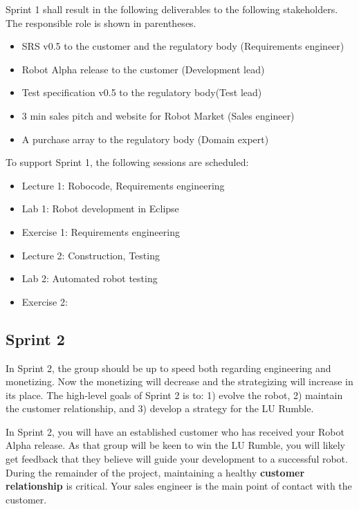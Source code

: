 \documentclass{scrreprt}
\begin{document}
Sprint 1 shall result in the following deliverables to the following stakeholders. The responsible role is shown in parentheses.
\begin{itemize}
\item SRS v0.5 to the customer and the regulatory body (Requirements engineer)
\item Robot Alpha release to the customer (Development lead)
\item Test specification v0.5 to the regulatory body(Test lead)
\item 3 min sales pitch and website for Robot Market (Sales engineer)
\item A purchase array to the regulatory body (Domain expert)
\end{itemize}

To support Sprint 1, the following sessions are scheduled:
\begin{itemize}
\item Lecture 1: Robocode, Requirements engineering
\item Lab 1: Robot development in Eclipse
\item Exercise 1: Requirements engineering
\item Lecture 2: Construction, Testing
\item Lab 2: Automated robot testing
\item Exercise 2:
\end{itemize}

\subsection{Sprint 2}
In Sprint 2, the group should be up to speed both regarding engineering and monetizing. Now the monetizing will decrease and the strategizing will increase in its place. The high-level goals of Sprint 2 is to: 1) evolve the robot, 2) maintain the customer relationship, and 3) develop a strategy for the LU Rumble.

In Sprint 2, you will have an established customer who has received your Robot Alpha release. As that group will be keen to win the LU Rumble, you will likely get feedback that they believe will guide your development to a successful robot. During the remainder of the project, maintaining a healthy \textbf{customer relationship} is critical. Your sales engineer is the main point of contact with the customer.
\end{document}
